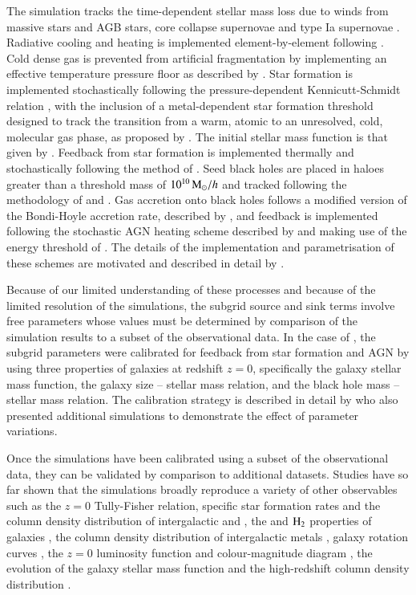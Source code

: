 The simulation tracks the time-dependent stellar mass loss due to winds from
massive stars and AGB stars, core collapse supernovae and type Ia supernovae
\citep{Wiersma2009b}. Radiative cooling and heating is implemented
element-by-element following \cite{Wiersma2009a}. Cold dense gas is prevented
from artificial fragmentation by implementing an effective temperature pressure
floor as described by \cite{Schaye_DallaVecchia2008}. Star formation is
implemented stochastically following the pressure-dependent Kennicutt-Schmidt
relation \citep{Schaye_DallaVecchia2008}, with the inclusion of a
metal-dependent star formation threshold designed to track the transition from a
warm, atomic to an unresolved, cold, molecular gas phase, as proposed by
\cite{Schaye2004}. The initial stellar mass function is that given by
\cite{Chabrier2003}. Feedback from star formation is implemented thermally and
stochastically following the method of \cite{DallaVecchia_Schaye2012}. Seed
black holes are placed in haloes greater than a threshold mass of $10^{10}\, \mathrm{M}_\odot
/ h$ and tracked following the methodology of \cite{Springel2005a} and
\cite{Booth_Schaye2009}. Gas accretion onto black holes follows a modified
version of the Bondi-Hoyle accretion rate, described by \citep[][, but modified
  as described by \cite{Schaye2015}]{Guevara2013}, and feedback is implemented
following the stochastic AGN heating scheme described by \cite{Schaye2015} and
making use of the energy threshold of \cite{Booth_Schaye2009}. The details of
the implementation and parametrisation of these schemes are motivated and
described in detail by \cite{Schaye2015}.

Because of our limited understanding of these processes and because of the
limited resolution of the simulations, the subgrid source and sink terms involve
free parameters whose values must be determined by comparison of the simulation
results to a subset of the observational data. In the case of \eagle, the
subgrid parameters were calibrated for feedback from star formation and AGN by
using three properties of galaxies at redshift $z=0$, specifically the galaxy
stellar mass function, the galaxy size -- stellar mass relation, and the black
hole mass -- stellar mass relation. The calibration strategy is described in
detail by \citet{Crain2015} who also presented additional simulations to
demonstrate the effect of parameter variations.

Once the simulations have been calibrated using a subset of the observational
data, they can be validated by comparison to additional datasets.  Studies have
so far shown that the simulations broadly reproduce a variety of other
observables such as the $z=0$ Tully-Fisher relation, specific star formation
rates and the column density distribution of intergalactic \CIV and \OVI
\citep{Schaye2015}, the \HI and $\rm{H}_2$ properties of galaxies \citep[Bah\'e
  et al. {\textit submitted},][]{Lagos2015}, the column density distribution of
intergalactic metals \citep{Schaye2015}, galaxy rotation curves
\citep{Schaller2015a}, the $z=0$ luminosity function and colour-magnitude
diagram \citep{Trayford2015}, the evolution of the galaxy stellar mass function
\citep{Furlong2015} and the high-redshift \HI column density distribution
\citep{Rahmati2015}.

